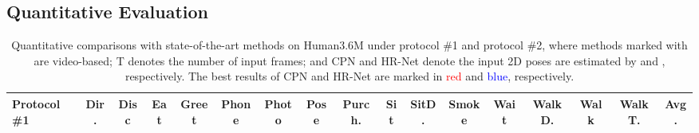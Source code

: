 \documentclass{article}
\begin{document}
\subsection{Quantitative Evaluation}
\begin{table*}
    \scriptsize
    \centering
    \tiny
    \caption{\small Quantitative comparisons with state-of-the-art methods on Human3.6M under protocol \#1 and protocol \#2, where methods marked with  are video-based; T denotes the number of input frames; and CPN and HR-Net denote the input 2D poses are estimated by \protect\cite{Chen2018CPN} and \protect\cite{SunXLW19}, respectively. The best results of CPN and HR-Net are marked in \textcolor{red}{red} and \textcolor{blue}{blue}, respectively.}
    \vspace{-0.1in}
    \setlength{\tabcolsep}{2mm}
    {
    \begin{tabular}{l|c|c|c|c|c|c|c|c|c|c|c|c|c|c|c|c}
    \hline
    \textbf{Protocol \#1} & Dir. & Disc & Eat & Greet & Phone & Photo & Pose & Purch. & Sit & SitD. & Smoke & Wait & WalkD. & Walk & WalkT. & Avg. \\ \hline


\end{tabular}}
\end{table*}
\end{document}
